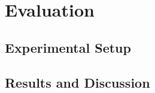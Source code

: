 \chapter{Evaluation}\label{sec:evaluation}

\section{Experimental Setup}
\label{sec:evaluation:setup}


\section{Results and Discussion}
\label{sec:evaluation:results}


